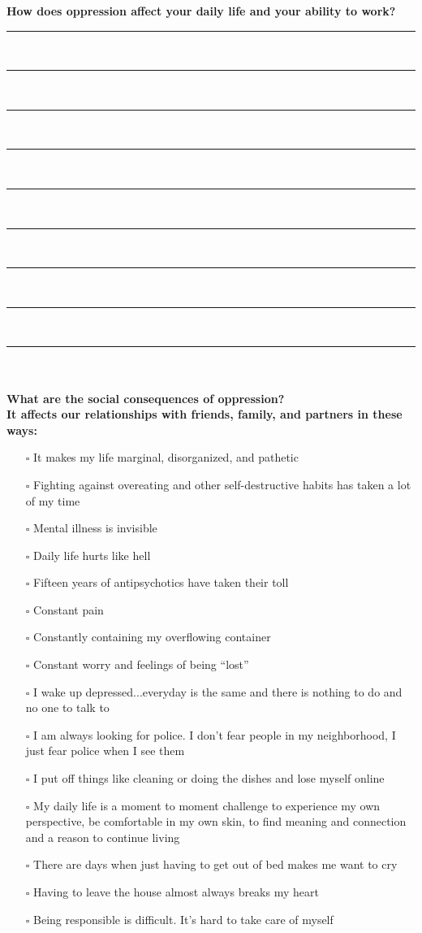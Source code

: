 \newpage
\noindent
\textcolor{ProcessBlue}{\textbf{\Large{How does oppression affect your daily life and your ability to work?}}}\\
\noindent\rule{\textwidth}{1pt}\\
\noindent\rule{\textwidth}{1pt}\\
\noindent\rule{\textwidth}{1pt}\\
\noindent\rule{\textwidth}{1pt}\\
\noindent\rule{\textwidth}{1pt}\\
\noindent\rule{\textwidth}{1pt}\\
\noindent\rule{\textwidth}{1pt}\\
\noindent\rule{\textwidth}{1pt}\\
\noindent\rule{\textwidth}{1pt}\\\\

\noindent\textcolor{ProcessBlue}{\textbf{\Large{What are the social consequences of oppression?}}}\\
\textbf{\large{It affects our relationships with friends, family, and partners in these ways:}}
\begin{multicols}{2}
\begin{itemize}
\item[$\square$]{It makes my life marginal, disorganized, and pathetic}
\item[$\square$]{Fighting against overeating and other self-destructive habits has taken a lot of my time}
\item[$\square$]{Mental illness is invisible}
\item[$\square$]{Daily life hurts like hell}
\item[$\square$]{Fifteen years of antipsychotics have taken their toll}
\item[$\square$]{Constant pain}
\item[$\square$]{Constantly containing my overflowing container}
\item[$\square$]{Constant worry and feelings of being “lost”}
\item[$\square$]{I wake up depressed...everyday is the same and there is nothing to do and no one to talk to}
\item[$\square$]{I am always looking for police. I don’t fear people in my neighborhood, I just fear police when I see them}
\item[$\square$]{I put off things like cleaning or doing the dishes and lose myself online}
\item[$\square$]{My daily life is a moment to moment challenge to experience my own perspective, be comfortable in my own skin, to find meaning and connection and a reason to continue living}
\item[$\square$]{There are days when just having to get out of bed makes me want to cry}
\item[$\square$]{Having to leave the house almost always breaks my heart}
\item[$\square$]{Being responsible is difficult. It’s hard to take care of myself}
\end{itemize}
\end{multicols}


